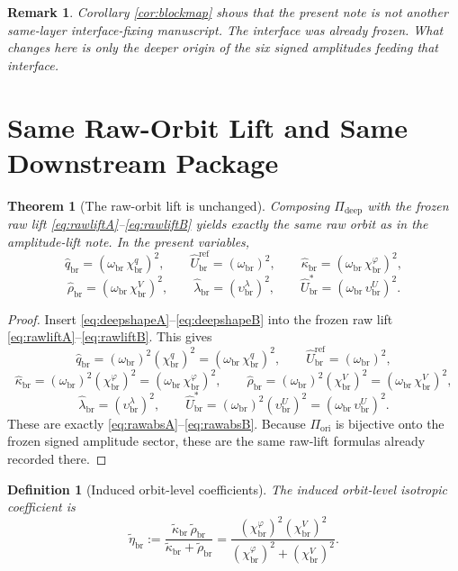 \documentclass[11pt]{article}
\newcommand{\RespShapeCov}{\widetilde\kappa_{\mathrm{br}}}
\newcommand{\RespShapeRelax}{\widetilde\rho_{\mathrm{br}}}
\newcommand{\RespShapeIso}{\widetilde\eta_{\mathrm{br}}}
\newcommand{\RespRawReadout}{\widehat q_{\mathrm{br}}}
\newcommand{\RespRawRef}{\widehat U_{\mathrm{br}}^{\mathrm{ref}}}
\newcommand{\RespRawCov}{\widehat\kappa_{\mathrm{br}}}
\newcommand{\RespRawRelax}{\widehat\rho_{\mathrm{br}}}
\newcommand{\RespRawWell}{\widehat\lambda_{\mathrm{br}}}
\newcommand{\RespRawEq}{\widehat U_{\mathrm{br}}^{\ast}}
\newcommand{\AbsReadAmp}{\chi_{\mathrm{br}}^{q}}
\newcommand{\AbsCovAmp}{\chi_{\mathrm{br}}^{\varphi}}
\newcommand{\AbsRelaxAmp}{\chi_{\mathrm{br}}^{V}}
\newcommand{\AbsWellAmp}{\upsilon_{\mathrm{br}}^{\lambda}}
\newcommand{\AbsEqAmp}{\upsilon_{\mathrm{br}}^{U}}
\newcommand{\AbsScaleAmp}{\omega_{\mathrm{br}}}
\newcommand{\OriginMap}{\Pi_{\mathrm{ori}}}
\newcommand{\DeepMap}{\Pi_{\mathrm{deep}}}
\newtheorem{definition}{Definition}
\newtheorem{remark}{Remark}
\newtheorem{theorem}{Theorem}
\begin{document}
\begin{remark}
Corollary \ref{cor:blockmap} shows that the present note is not another same-layer interface-fixing manuscript. The interface was already frozen. What changes here is only the deeper origin of the six signed amplitudes feeding that interface.
\end{remark}

\section{Same Raw-Orbit Lift and Same Downstream Package}

\begin{theorem}[The raw-orbit lift is unchanged]
\label{thm:rawlift}
Composing \(\DeepMap\) with the frozen raw lift \eqref{eq:rawliftA}--\eqref{eq:rawliftB} yields exactly the same raw orbit as in the amplitude-lift note. In the present variables,
\begin{equation}
\RespRawReadout=(\AbsScaleAmp\,\AbsReadAmp)^2,
\qquad
\RespRawRef=(\AbsScaleAmp)^2,
\qquad
\RespRawCov=(\AbsScaleAmp\,\AbsCovAmp)^2,
\label{eq:rawabsA}
\end{equation}
\begin{equation}
\RespRawRelax=(\AbsScaleAmp\,\AbsRelaxAmp)^2,
\qquad
\RespRawWell=(\AbsWellAmp)^2,
\qquad
\RespRawEq=(\AbsScaleAmp\,\AbsEqAmp)^2.
\label{eq:rawabsB}
\end{equation}
\end{theorem}

\begin{proof}
Insert \eqref{eq:deepshapeA}--\eqref{eq:deepshapeB} into the frozen raw lift \eqref{eq:rawliftA}--\eqref{eq:rawliftB}. This gives
\[
\RespRawReadout=(\AbsScaleAmp)^2(\AbsReadAmp)^2=(\AbsScaleAmp\,\AbsReadAmp)^2,
\qquad
\RespRawRef=(\AbsScaleAmp)^2,
\]
\[
\RespRawCov=(\AbsScaleAmp)^2(\AbsCovAmp)^2=(\AbsScaleAmp\,\AbsCovAmp)^2,
\qquad
\RespRawRelax=(\AbsScaleAmp)^2(\AbsRelaxAmp)^2=(\AbsScaleAmp\,\AbsRelaxAmp)^2,
\]
\[
\RespRawWell=(\AbsWellAmp)^2,
\qquad
\RespRawEq=(\AbsScaleAmp)^2(\AbsEqAmp)^2=(\AbsScaleAmp\,\AbsEqAmp)^2.
\]
These are exactly \eqref{eq:rawabsA}--\eqref{eq:rawabsB}. Because \(\OriginMap\) is bijective onto the frozen signed amplitude sector, these are the same raw-lift formulas already recorded there.
\end{proof}

\begin{definition}[Induced orbit-level coefficients]
\label{def:isocoeff}
The induced orbit-level isotropic coefficient is
\begin{equation}
\RespShapeIso
:=
\frac{\RespShapeCov\,\RespShapeRelax}{\RespShapeCov+\RespShapeRelax}
=
\frac{(\AbsCovAmp)^2(\AbsRelaxAmp)^2}{(\AbsCovAmp)^2+(\AbsRelaxAmp)^2}.
\label{eq:iso}
\end{equation}
\end{definition}
\end{document}
